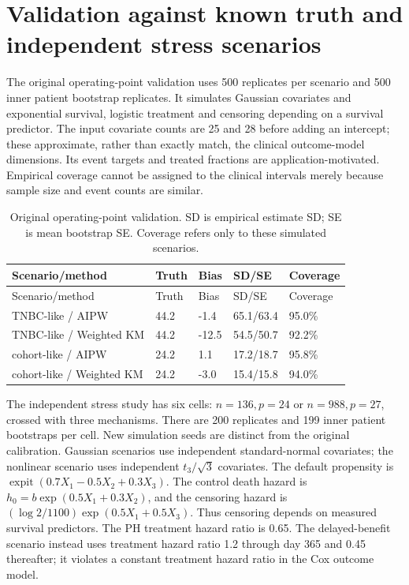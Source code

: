 \documentclass[12pt,letterpaper]{article}
\begin{document}
\section{Validation against known truth and independent stress scenarios}
The original operating-point validation uses 500 replicates per scenario and 500 inner patient bootstrap
replicates. It simulates Gaussian covariates and exponential survival, logistic treatment and censoring
depending on a survival predictor. The input covariate counts are 25 and 28 before adding an intercept;
these approximate, rather than exactly match, the clinical outcome-model dimensions. Its event targets
and treated fractions are application-motivated. Empirical coverage cannot be assigned to the clinical
intervals merely because sample size and event counts are similar.

\begin{longtable}{p{1.85in}p{0.7in}p{0.7in}p{1.1in}p{1.1in}}
\caption{Original operating-point validation. SD is empirical estimate SD; SE is mean bootstrap SE. Coverage refers only to these simulated scenarios.}\\
\toprule
Scenario/method & Truth & Bias & SD/SE & Coverage \\
\midrule\endfirsthead
\toprule
Scenario/method & Truth & Bias & SD/SE & Coverage \\
\midrule\endhead
\bottomrule\endfoot
TNBC-like / AIPW & 44.2 & -1.4 & 65.1/63.4 & 95.0\% \\
TNBC-like / Weighted KM & 44.2 & -12.5 & 54.5/50.7 & 92.2\% \\
cohort-like / AIPW & 24.2 & 1.1 & 17.2/18.7 & 95.8\% \\
cohort-like / Weighted KM & 24.2 & -3.0 & 15.4/15.8 & 94.0\% \\
\end{longtable}
The independent stress study has six cells: $n=136,p=24$ or $n=988,p=27$, crossed with
three mechanisms. There are 200 replicates and 199 inner patient bootstraps per cell. New simulation seeds
are distinct from the original calibration. Gaussian scenarios use independent standard-normal covariates;
the nonlinear scenario uses independent $t_3/\sqrt{3}$ covariates. The default propensity is
$\operatorname{expit}(0.7X_1-0.5X_2+0.3X_3)$. The control death hazard is
$h_0=b\exp(0.5X_1+0.3X_2)$, and the censoring hazard is
$(\log 2/1100)\exp(0.5X_1+0.5X_3)$. Thus censoring depends on measured survival predictors.
The PH treatment hazard ratio is 0.65. The delayed-benefit scenario instead uses treatment hazard ratio
1.2 through day 365 and 0.45 thereafter; it violates a constant treatment hazard ratio in the Cox outcome model.
\end{document}
